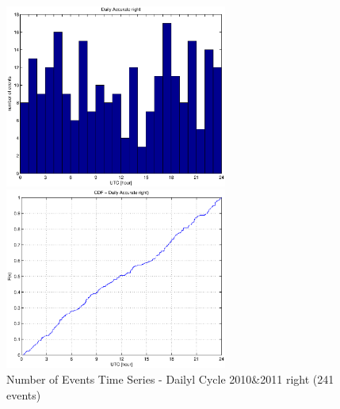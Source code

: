 \documentclass[a4paper,11pt]{article}
\begin{document}
\begin{figure}[htbp]
\begin{minipage}{0.55\hsize}
\centering
\includegraphics[width=7.3cm, clip]{histTimeDailyR.eps}
\end{minipage}
\begin{minipage}{0.55\hsize}
 \centering
\includegraphics[width=7.3cm, clip]{CDFTimeDailyR.eps}
\end{minipage}
\caption{Number of Events Time Series - Dailyl Cycle 2010\&2011 right (241 events)}
\end{figure}
\end{document}
